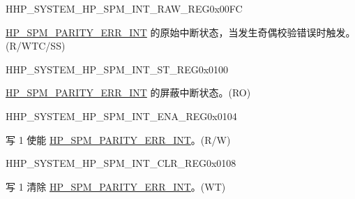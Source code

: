 \begin{register}{H}{HP\_SYSTEM\_HP\_SPM\_INT\_RAW\_REG}{0x00FC}\label{regdesc:HPSYSTEMHPSPMINTRAWREG}
%
%
\regnewline%
\begin{regdesc}\begin{reglist}
\label{fielddesc:HPSYSTEMHPSPMPARITYERRINTRAW}\item [HP\_SYSTEM\_HP\_SPM\_PARITY\_ERR\_INT\_RAW] \hyperref[tab:sysreg-int-sources]{HP\_SPM\_PARITY\_ERR\_INT} 的原始中断状态，当发生奇偶校验错误时触发。(R/WTC/SS)
\end{reglist}\end{regdesc}
\end{register}


\begin{register}{H}{HP\_SYSTEM\_HP\_SPM\_INT\_ST\_REG}{0x0100}\label{regdesc:HPSYSTEMHPSPMINTSTREG}
%
%
\regnewline%
\begin{regdesc}\begin{reglist}
\label{fielddesc:HPSYSTEMHPSPMPARITYERRINTST}\item [HP\_SYSTEM\_HP\_SPM\_PARITY\_ERR\_INT\_ST] \hyperref[tab:sysreg-int-sources]{HP\_SPM\_PARITY\_ERR\_INT} 的屏蔽中断状态。(RO)
\end{reglist}\end{regdesc}
\end{register}


\begin{register}{H}{HP\_SYSTEM\_HP\_SPM\_INT\_ENA\_REG}{0x0104}\label{regdesc:HPSYSTEMHPSPMINTENAREG}
%
%
\regnewline%
\begin{regdesc}\begin{reglist}
\label{fielddesc:HPSYSTEMHPSPMPARITYERRINTENA}\item [HP\_SYSTEM\_HP\_SPM\_PARITY\_ERR\_INT\_ENA] 写 1 使能 \hyperref[tab:sysreg-int-sources]{HP\_SPM\_PARITY\_ERR\_INT}。(R/W)
\end{reglist}\end{regdesc}
\end{register}


\begin{register}{H}{HP\_SYSTEM\_HP\_SPM\_INT\_CLR\_REG}{0x0108}\label{regdesc:HPSYSTEMHPSPMINTCLRREG}
%
%
\regnewline%
\begin{regdesc}\begin{reglist}
\label{fielddesc:HPSYSTEMHPSPMPARITYERRINTCLR}\item [HP\_SYSTEM\_HP\_SPM\_PARITY\_ERR\_INT\_CLR] 写 1 清除 \hyperref[tab:sysreg-int-sources]{HP\_SPM\_PARITY\_ERR\_INT}。(WT)
\end{reglist}\end{regdesc}
\end{register}


